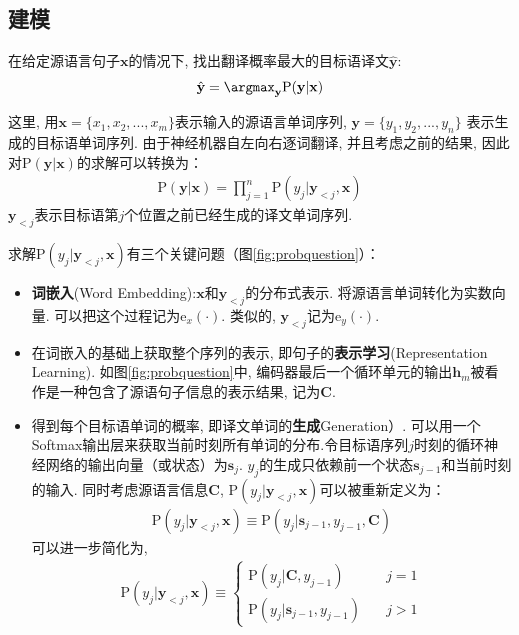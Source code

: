 \subsection{建模}

\parinterval 在给定源语言句子$\mathbf{x}$的情况下, 找出翻译概率最大的目标语译文$\hat{\mathbf{y}}$:
\begin{eqnarray}
\hat{\mathbf{y}} = \argmax_{\mathbf{y}} \textrm{P} (\mathbf{y} | \mathbf{x})
\end{eqnarray}

\noindent 这里, 用$\mathbf{x}=\{ x_1, x_2, ...,  x_m \}$表示输入的源语言单词序列, $\mathbf{y}=\{ y_1, y_2, ...,  y_n \}$ 表示生成的目标语单词序列. 由于神经机器自左向右逐词翻译, 并且考虑之前的结果, 因此对$\textrm{P} (\mathbf{y} | \mathbf{x})$的求解可以转换为：
\begin{eqnarray}
\textrm{P} (\mathbf{y} | \mathbf{x}) = \prod_{j=1}^{n} \textrm{P} ( y_j | \mathbf{y}_{<j },  \mathbf{x}  )
\end{eqnarray}
$ \mathbf{y}_{<j }$表示目标语第$j$个位置之前已经生成的译文单词序列. 

\parinterval 求解$\textrm{P}(y_j | \mathbf{y}_{<j}, \mathbf{x})$有三个关键问题（图\ref{fig:probquestion}）：

\begin{itemize}
\item	{\small\sffamily\bfseries{词嵌入}}(Word Embedding):$\mathbf{x}$和$\mathbf{y}_{<j }$的分布式表示. 将源语言单词转化为实数向量. 可以把这个过程记为$\textrm{e}_x (\cdot)$. 类似的, $\mathbf{y}_{<j }$记为$\textrm{e}_y (\cdot)$. 
\item	在词嵌入的基础上获取整个序列的表示, 即句子的{\small\sffamily\bfseries{表示学习}}(Representation Learning). 如图\ref{fig:probquestion}中, 编码器最后一个循环单元的输出$\mathbf{h}_m$被看作是一种包含了源语句子信息的表示结果, 记为$\mathbf{C}$. 
\item	得到每个目标语单词的概率, 即译文单词的{\small\sffamily\bfseries{生成}}Generation）. 可以用一个Softmax输出层来获取当前时刻所有单词的分布.令目标语序列$j$时刻的循环神经网络的输出向量（或状态）为$\mathbf{s}_j$. $ y_j$的生成只依赖前一个状态$\mathbf{s}_{j-1}$和当前时刻的输入. 同时考虑源语言信息$\mathbf{C}$, $\textrm{P}(y_j  | \mathbf{y}_{<j}, \mathbf{x})$可以被重新定义为：
\begin{eqnarray}
\textrm{P} (y_j | \mathbf{y}_{<j}, \mathbf{x}) \equiv \textrm{P} ( {y_j | \mathbf{s}_{j-1} , y_{j-1}, \mathbf{C}} )
\end{eqnarray}
可以进一步简化为, 
\begin{eqnarray}
\textrm{P} (y_j | \mathbf{y}_{<j}, \mathbf{x}) \equiv
 \left \{ \begin{array}{ll}
\textrm{P} (y_j |\mathbf{C} , y_{j-1}) &j=1 \\
\textrm{P} (y_j|\mathbf{s}_{j-1}, y_{j-1})  \quad &j>1
\end{array} \right . 
\end{eqnarray}
\end{itemize}

